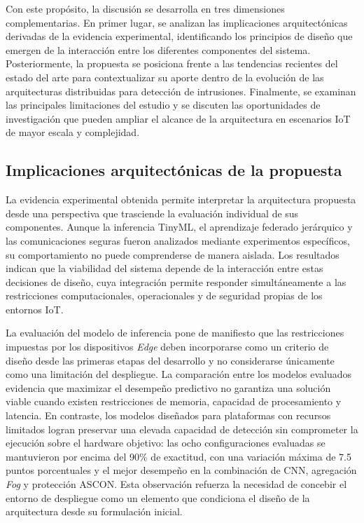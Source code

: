\documentclass[journal,article,submit,moreauthors]{Definitions/mdpi}
\begin{document}
Con este propósito, la discusión se desarrolla en tres dimensiones complementarias. En primer lugar, se analizan las implicaciones arquitectónicas derivadas de la evidencia experimental, identificando los principios de diseño que emergen de la interacción entre los diferentes componentes del sistema. Posteriormente, la propuesta se posiciona frente a las tendencias recientes del estado del arte para contextualizar su aporte dentro de la evolución de las arquitecturas distribuidas para detección de intrusiones. Finalmente, se examinan las principales limitaciones del estudio y se discuten las oportunidades de investigación que pueden ampliar el alcance de la arquitectura en escenarios IoT de mayor escala y complejidad.

\subsection{Implicaciones arquitectónicas de la propuesta}
La evidencia experimental obtenida permite interpretar la arquitectura propuesta desde una perspectiva que trasciende la evaluación individual de sus componentes. Aunque la inferencia TinyML, el aprendizaje federado jerárquico y las comunicaciones seguras fueron analizados mediante experimentos específicos, su comportamiento no puede comprenderse de manera aislada. Los resultados indican que la viabilidad del sistema depende de la interacción entre estas decisiones de diseño, cuya integración permite responder simultáneamente a las restricciones computacionales, operacionales y de seguridad propias de los entornos IoT.

La evaluación del modelo de inferencia pone de manifiesto que las restricciones impuestas por los dispositivos \textit{Edge} deben incorporarse como un criterio de diseño desde las primeras etapas del desarrollo y no considerarse únicamente como una limitación del despliegue. La comparación entre los modelos evaluados evidencia que maximizar el desempeño predictivo no garantiza una solución viable cuando existen restricciones de memoria, capacidad de procesamiento y latencia. En contraste, los modelos diseñados para plataformas con recursos limitados logran preservar una elevada capacidad de detección sin comprometer la ejecución sobre el hardware objetivo: las ocho configuraciones evaluadas se mantuvieron por encima del 90\% de exactitud, con una variación máxima de 7.5 puntos porcentuales y el mejor desempeño en la combinación de CNN, agregación \textit{Fog} y protección ASCON. Esta observación refuerza la necesidad de concebir el entorno de despliegue como un elemento que condiciona el diseño de la arquitectura desde su formulación inicial.
\end{document}
